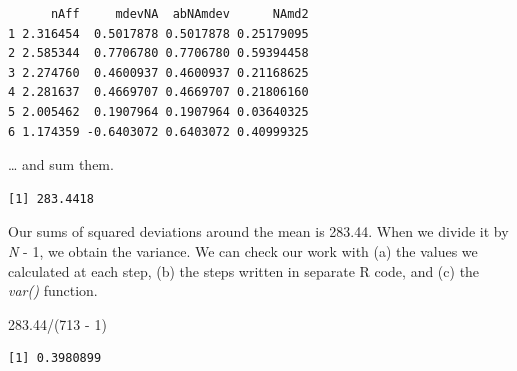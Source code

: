 \documentclass[
  11pt,
]{book}
\newenvironment{Shaded}{\begin{snugshade}}{\end{snugshade}}
\newcommand{\AttributeTok}[1]{\textcolor[rgb]{0.77,0.63,0.00}{#1}}
\newcommand{\CommentTok}[1]{\textcolor[rgb]{0.56,0.35,0.01}{\textit{#1}}}
\newcommand{\ConstantTok}[1]{\textcolor[rgb]{0.00,0.00,0.00}{#1}}
\newcommand{\DecValTok}[1]{\textcolor[rgb]{0.00,0.00,0.81}{#1}}
\newcommand{\FloatTok}[1]{\textcolor[rgb]{0.00,0.00,0.81}{#1}}
\newcommand{\FunctionTok}[1]{\textcolor[rgb]{0.00,0.00,0.00}{#1}}
\newcommand{\NormalTok}[1]{#1}
\newcommand{\OtherTok}[1]{\textcolor[rgb]{0.56,0.35,0.01}{#1}}
\newcommand{\SpecialCharTok}[1]{\textcolor[rgb]{0.00,0.00,0.00}{#1}}
\begin{document}
\begin{Shaded}
\end{Shaded}

\begin{verbatim}
      nAff     mdevNA  abNAmdev      NAmd2
1 2.316454  0.5017878 0.5017878 0.25179095
2 2.585344  0.7706780 0.7706780 0.59394458
3 2.274760  0.4600937 0.4600937 0.21168625
4 2.281637  0.4669707 0.4669707 0.21806160
5 2.005462  0.1907964 0.1907964 0.03640325
6 1.174359 -0.6403072 0.6403072 0.40999325
\end{verbatim}

\ldots{} and sum them.

\begin{Shaded}
\end{Shaded}

\begin{verbatim}
[1] 283.4418
\end{verbatim}

Our sums of squared deviations around the mean is 283.44. When we divide it by \emph{N} - 1, we obtain the variance. We can check our work with (a) the values we calculated at each step, (b) the steps written in separate R code, and (c) the \emph{var()} function.

\begin{Shaded}
\begin{Highlighting}[]
\FloatTok{283.44}\SpecialCharTok{/}\NormalTok{(}\DecValTok{713} \SpecialCharTok{{-}} \DecValTok{1}\NormalTok{)}
\end{Highlighting}
\end{Shaded}

\begin{verbatim}
[1] 0.3980899
\end{verbatim}

\begin{Shaded}
\end{Shaded}
\end{document}
